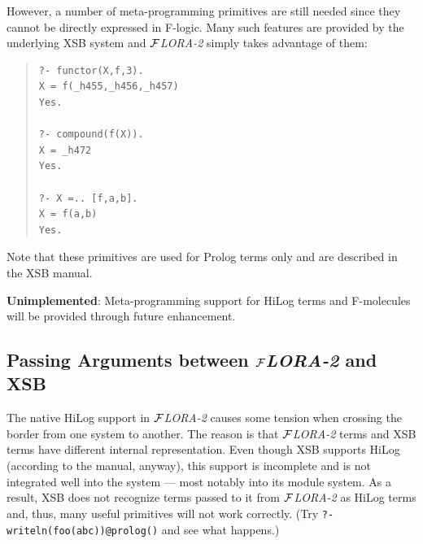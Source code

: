 \documentclass[11pt]{article}
\newcommand{\FLORA}{{\mbox{${\cal F}${\small\it LORA}\rm\emph{-2}}}\xspace}
\newcommand{\fl}{\mbox{F-logic}\xspace}
\begin{document}
However, a number of meta-programming primitives are still needed
since they cannot be directly expressed in \fl. Many such features are
provided by the underlying XSB system and \FLORA simply takes advantage of
them: 
\begin{quote}
\begin{verbatim}
?- functor(X,f,3).
X = f(_h455,_h456,_h457)
Yes.

?- compound(f(X)).
X = _h472
Yes.

?- X =.. [f,a,b].
X = f(a,b)
Yes.
\end{verbatim}
\end{quote}
Note that these primitives are used for Prolog terms only and
are described in the XSB manual.

{\bf Unimplemented}: Meta-programming support for HiLog terms and
F-molecules will be provided through future enhancement.


\subsection{Passing Arguments between \FLORA and XSB}\label{sec-passing-args}

The native HiLog support in \FLORA causes some tension when crossing the
border from one system to another. The reason is that \FLORA terms and XSB
terms have different internal representation. Even though XSB supports
HiLog (according to the manual, anyway), this support is incomplete and is
not integrated well into the system --- most notably into its module
system. As a result, XSB does not recognize terms passed to it from \FLORA
as HiLog terms and, thus, many useful primitives will not work correctly.
(Try {\tt ?- writeln(foo(abc))@prolog()} and see what happens.)
\end{document}
